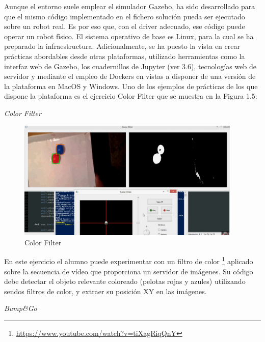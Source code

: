 Aunque el entorno suele emplear el simulador Gazebo, ha sido desarrollado para que el mismo código implementado en el fichero solución pueda ser ejecutado sobre un robot real. Es por eso que, con el driver adecuado, ese código puede operar un robot físico. El sistema operativo de base es Linux, para la cual se ha preparado la infraestructura. Adicionalmente, se ha puesto la vista en crear prácticas abordables desde otras plataformas, utilizado herramientas como la interfaz web de Gazebo, los cuadernillos de Jupyter (ver 3.6), tecnologías web de servidor y mediante el empleo de Dockers en vistas a disponer de una versión de la plataforma en MacOS y Windows.
Uno de los ejemplos de prácticas de los que dispone la plataforma es el ejercicio Color Filter que se muestra en la Figura 1.5:

\hspace{0.4\linewidth}
\textit{Color Filter}

\begin{figure}[H]
  \begin{center}
    \includegraphics[width=0.95\textwidth]{figures/color_filter.png}
		\caption{Color Filter}
		\label{fig.colorfilter}
		\end{center}
\end{figure}

En este ejercicio el alumno puede experimentar con un filtro de color \footnote{\url{https://www.youtube.com/watch?v=tiXagRiqQnY}} aplicado sobre la secuencia de vídeo que proporciona un servidor de imágenes. Su código debe detectar el objeto relevante coloreado (pelotas rojas y azules) utilizando sendos filtros de color, y extraer su posición XY en las imágenes. 

\vspace{4cm}
\hspace{0.40\linewidth}
\textit{Bump\&Go}

